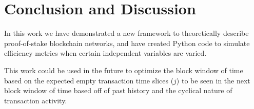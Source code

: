 \documentclass[conference]{IEEEtran}
\begin{document}
\section{Conclusion and Discussion}

In this work we have demonstrated a new framework to theoretically describe proof-of-stake
blockchain networks, and have created Python code to simulate efficiency metrics when 
certain independent variables are varied. 

This work could be used in the future to optimize the block window of time based on the 
expected empty transaction time slices ($j$) to be seen in the next block window of time 
based off of past history and the cyclical nature of transaction activity. 



\end{document}
